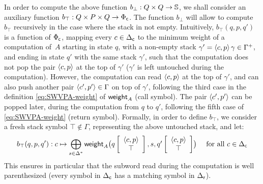 \noindent
In order to compute the above function $b_\bot : Q \times Q \to \mathbb{S}$,
we shall consider an auxiliary function $b_\top :  Q \times P \times Q \to {\Phi_\mathsf{c}}$.
The function $b_\bot$ will allow to compute $b_\top$ recursively in the case where the stack in not empty.
%
Intuitively, $b_\top(q, p, q')$ is a function of ${\Phi_\mathsf{c}}$,
mapping every $c \in {\Delta_\mathsf{c}}$ to
the minimum weight of a computation of~$A$
starting in state $q$, 
with a non-empty stack $\gamma' = \<c, p> \, \gamma \in \Gamma^+$,
and ending in state $q'$ with the same stack $\gamma'$,
such that
the computation does not pop the pair $\<c, p>$ at the top of $\gamma'$
(\ie $\gamma'$ is left untouched during the computation).
However, the computation can read $\<c, p>$ at the top of $\gamma'$,
and can also push another pair $\< c', p'> \in \Gamma$ on top of $\gamma'$,
following the third case 
in the definition \eqref{eq:SWVPA-weight} of $\mathsf{weight}_A$ (call symbol).
The pair $\< c', p'>$ can be popped later, during the computation from $q$ to $q'$,
following the fifth case of \eqref{eq:SWVPA-weight} (return symbol).
%
%
Formally, in order to define $b_\top$, we consider
a fresh stack symbol $\top \notin \Gamma$,   %
representing the above untouched stack, and let:
%
\begin{equation}\label{eq:btop}
  b_\top(q, p, q') : c \mapsto \bigoplus_{s\in \Delta^*}
  \textstyle
  \weight_A\bigl(\configup{q}{\< c, p> \stackup \top }, s, \configup{q'}{\<c, p> \stackup \top}\bigr)
\quad
\mathrm{~for~all~} c \in \Deltac
\end{equation}
%
%
This ensures in particular that the subword
read during the computation is well parenthesized
(every symbol in ${\Delta_\mathsf{c}}$ has a matching symbol in ${\Delta_\mathsf{r}}$).

